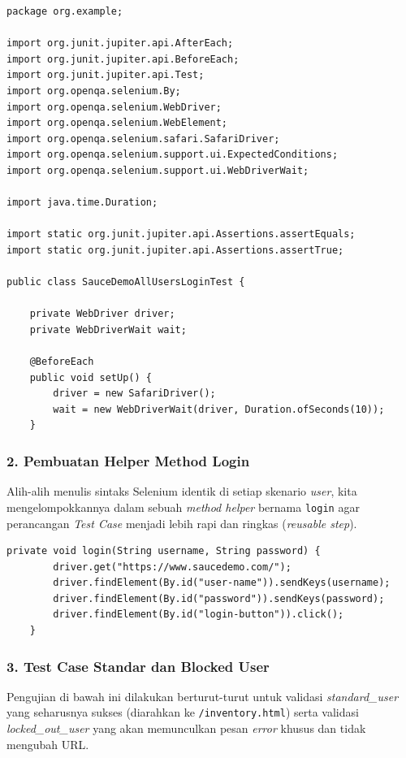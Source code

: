 \documentclass[a4paper,oneside,12pt]{report}
\begin{document}
\begin{lstlisting}[style=javastyle, caption=Import dan Setup Skenario Lengkap]
package org.example;

import org.junit.jupiter.api.AfterEach;
import org.junit.jupiter.api.BeforeEach;
import org.junit.jupiter.api.Test;
import org.openqa.selenium.By;
import org.openqa.selenium.WebDriver;
import org.openqa.selenium.WebElement;
import org.openqa.selenium.safari.SafariDriver;
import org.openqa.selenium.support.ui.ExpectedConditions;
import org.openqa.selenium.support.ui.WebDriverWait;

import java.time.Duration;

import static org.junit.jupiter.api.Assertions.assertEquals;
import static org.junit.jupiter.api.Assertions.assertTrue;

public class SauceDemoAllUsersLoginTest {

    private WebDriver driver;
    private WebDriverWait wait;

    @BeforeEach
    public void setUp() {
        driver = new SafariDriver();
        wait = new WebDriverWait(driver, Duration.ofSeconds(10));
    }
\end{lstlisting}

\subsubsection*{2. Pembuatan Helper Method Login}
Alih-alih menulis sintaks Selenium identik di setiap skenario \textit{user}, kita mengelompokkannya dalam sebuah \textit{method helper} bernama \texttt{login} agar perancangan \textit{Test Case} menjadi lebih rapi dan ringkas (\textit{reusable step}).

\begin{lstlisting}[style=javastyle, caption=Method Helper Interaksi Login]
    private void login(String username, String password) {
        driver.get("https://www.saucedemo.com/");
        driver.findElement(By.id("user-name")).sendKeys(username);
        driver.findElement(By.id("password")).sendKeys(password);
        driver.findElement(By.id("login-button")).click();
    }
\end{lstlisting}
\newpage
\subsubsection*{3. Test Case Standar dan Blocked User}
Pengujian di bawah ini dilakukan berturut-turut untuk validasi \textit{standard\_user} yang seharusnya sukses (diarahkan ke \texttt{/inventory.html}) serta validasi \textit{locked\_out\_user} yang akan memunculkan pesan \textit{error} khusus dan tidak mengubah URL.
\end{document}
